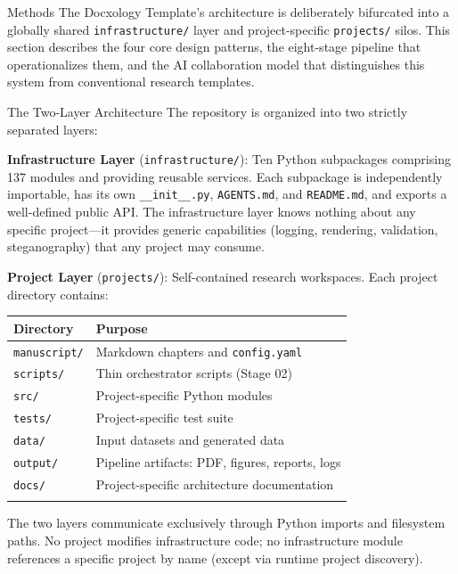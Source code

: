 \documentclass[
  ignorenonframetext,
]{beamer}
\author{\texorpdfstring{}{}}
\date{}
\newcounter{none} %
\begin{document}
\begin{frame}[fragile]{Methods}
\protect{}\label{methods}
The Docxology Template's architecture is deliberately bifurcated into a
globally shared \texttt{infrastructure/} layer and project-specific
\texttt{projects/} silos. This section describes the four core design
patterns, the eight-stage pipeline that operationalizes them, and the AI
collaboration model that distinguishes this system from conventional
research templates.

\begin{block}{The Two-Layer Architecture}
\protect{}\label{the-two-layer-architecture}
The repository is organized into two strictly separated layers:

\textbf{Infrastructure Layer} (\texttt{infrastructure/}): Ten Python
subpackages comprising 137 modules and providing reusable services. Each
subpackage is independently importable, has its own
\texttt{\_\_init\_\_.py}, \texttt{AGENTS.md}, and \texttt{README.md},
and exports a well-defined public API. The infrastructure layer knows
nothing about any specific project---it provides generic capabilities
(logging, rendering, validation, steganography) that any project may
consume.

\textbf{Project Layer} (\texttt{projects/}): Self-contained research
workspaces. Each project directory contains:

{\def\LTcaptype{none} %
\begin{longtable}[]{@{}ll@{}}
\toprule\noalign{}
Directory & Purpose \\
\midrule\noalign{}
\endhead
\texttt{manuscript/} & Markdown chapters and \texttt{config.yaml} \\
\texttt{scripts/} & Thin orchestrator scripts (Stage 02) \\
\texttt{src/} & Project-specific Python modules \\
\texttt{tests/} & Project-specific test suite \\
\texttt{data/} & Input datasets and generated data \\
\texttt{output/} & Pipeline artifacts: PDF, figures, reports, logs \\
\texttt{docs/} & Project-specific architecture documentation \\
\bottomrule\noalign{}
\end{longtable}
}

The two layers communicate exclusively through Python imports and
filesystem paths. No project modifies infrastructure code; no
infrastructure module references a specific project by name (except via
runtime project discovery).
\end{block}


\end{frame}
\end{document}
